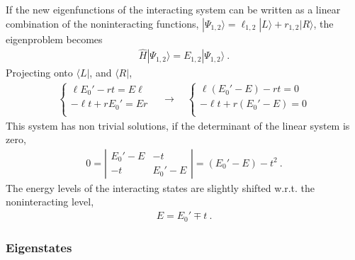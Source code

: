 \documentclass[letterpaper,10pt,english]{jupyterBook}
\begin{document}
\sphinxAtStartPar
If the new eigen\sphinxhyphen{}functions of the interacting system can be written as a linear combination of the non\sphinxhyphen{}interacting functions, \(| \Psi_{1,2} \rangle= \ell_{1,2} | L \rangle + r_{1,2} | R \rangle\), the eigen\sphinxhyphen{}problem becomes
\begin{equation*}
\begin{split}\hat{H} | \Psi_{1,2} \rangle = E_{1,2} | \Psi_{1,2} \rangle \ .\end{split}
\end{equation*}
\sphinxAtStartPar
Projecting onto \(\langle L |\), and \(\langle R |\),
\begin{equation*}
\begin{split}
\begin{cases}
     \ell E_0' - r t    = E \ell \\
   - \ell t    + r E_0' = E r    \\
\end{cases}
\quad \rightarrow \quad
\begin{cases}
     \ell (E_0'-E) - r t    = 0 \\
   - \ell t    + r (E_0'-E) = 0 \\
\end{cases}
\end{split}
\end{equation*}
\sphinxAtStartPar
This system has non trivial solutions, if the determinant of the linear system is zero,
\begin{equation*}
\begin{split}0 = \left| \begin{matrix} E_0' - E & -t \\ -t & E_0' - E \end{matrix}\right| = ( E_0' - E ) - t^2 \ . \end{split}
\end{equation*}
\sphinxAtStartPar
The energy levels of the interacting states are slightly shifted w.r.t. the non\sphinxhyphen{}interacting level,
\begin{equation*}
\begin{split}E = E_0' \mp t \ .\end{split}
\end{equation*}\subsubsection*{Eigen\sphinxhyphen{}states}
\end{document}
